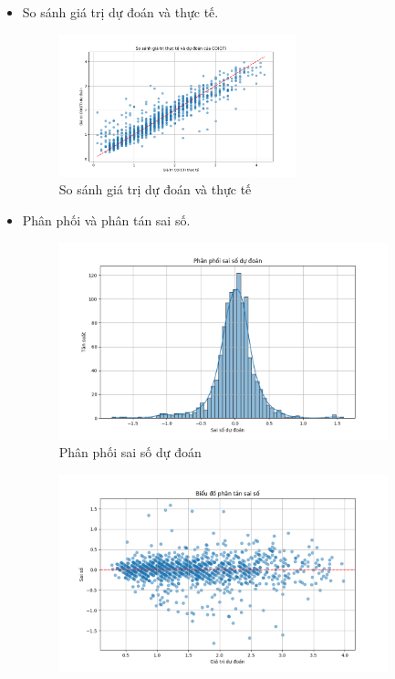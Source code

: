 \begin{itemize}
    \item So sánh giá trị dự đoán và thực tế.
    \begin{figure}[H]
        \centering
        \includegraphics[width=0.65\textwidth]{images/Linear_regression/actual_vs_predicted.png}
        \caption{So sánh giá trị dự đoán và thực tế}
        \label{fig:importance}
    \end{figure}
    \item Phân phối và phân tán sai số.
    \begin{figure}[H]
        \centering
        \includegraphics[width=0.9\textwidth]{images/Linear_regression/residuals_histogram.png}
        \caption{Phân phối sai số dự đoán}
        \label{fig:importance}
    \end{figure}
    \begin{figure}[H]
        \centering
        \includegraphics[width=0.9\textwidth]{images/Linear_regression/residuals_scatter.png}

\end{figure}
\end{itemize}
